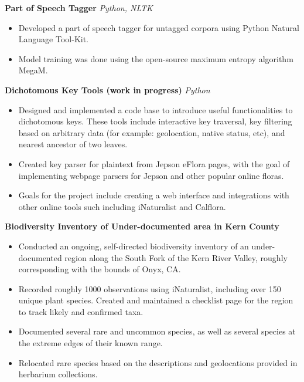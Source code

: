 \documentclass[]{article}
\begin{document}
	{\textbf{Part of Speech Tagger}} \hspace*{5mm} {\sl Python, NLTK} \\
	\vspace*{-5pt}\begin{itemize}	\itemsep 0pt
		\item Developed a part of speech tagger for untagged corpora using Python Natural Language Tool-Kit.
		\item Model training was done using the open-source maximum entropy algorithm MegaM.
	\end{itemize}
	\vspace*{0mm}
	
		{\textbf{Dichotomous Key Tools (work in progress)}} \hspace*{5mm} {\sl Python} \\
	\vspace*{-5pt}\begin{itemize}	\itemsep 0pt
		\item Designed and implemented a code base to introduce useful functionalities to dichotomous keys.  These tools include interactive key traversal, key filtering based on arbitrary data (for example: geolocation, native status, etc), and nearest ancestor of two leaves. 
		\item Created key parser for plaintext from Jepson eFlora pages, with the goal of implementing webpage parsers for Jepson and other popular online floras.
		\item Goals for the project include creating a web interface and integrations with other online tools such including iNaturalist and Calflora.
	\end{itemize}
	\vspace*{0mm}
	
	{\textbf{Biodiversity Inventory of Under-documented area in Kern County}} \hspace*{5mm} \\
	\vspace*{-5pt}\begin{itemize}	\itemsep 0pt
		\item Conducted an ongoing, self-directed biodiversity inventory of an under-documented region along the South Fork of the Kern River Valley, roughly corresponding with the bounds of Onyx, CA.
		\item Recorded roughly 1000 observations using iNaturalist, including over 150 unique plant species.  Created and maintained a checklist page for the region to track likely and confirmed taxa.
		\item Documented several rare and uncommon species, as well as several species at the extreme edges of their known range.
		\item Relocated rare species based on the descriptions and geolocations provided in herbarium collections.
	\end{itemize}
	\vspace*{0mm}
	
\end{document}
